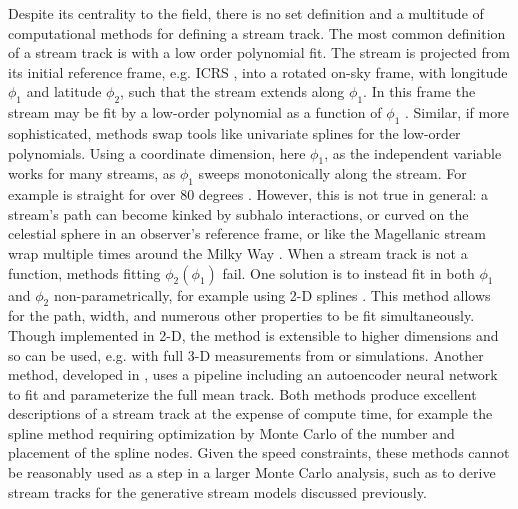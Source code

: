 \documentclass[fleqn,usenatbib]{mnras}
\begin{document}
  Despite its centrality to the field, there is no set definition and a
  multitude of computational methods for defining a stream track. The most
  common definition of a stream track is with a low order polynomial fit. The
  stream is projected from its initial reference frame, e.g. ICRS
  \citep{ICRS1997}, into a rotated on-sky frame, with longitude $\phi_1$ and
  latitude $\phi_2$, such that the stream extends along $\phi_1$. In this frame
  the stream may be fit by a low-order polynomial as a function of $\phi_1$
  \citep[e.g.][]{Bonaca2020}. Similar, if more sophisticated, methods swap tools
  like univariate splines \citep[e.g.][]{Erkal2017, Bonaca2018} for the
  low-order polynomials. Using a coordinate dimension, here $\phi_1$, as the
  independent variable works for many streams, as $\phi_1$ sweeps monotonically
  along the stream. For example  is straight for over 80 degrees
  \citep{Webb2019, Price-Whelan2018}. However, this is not true in general: a
  stream's path can become kinked by subhalo interactions, or curved on the
  celestial sphere in an observer's reference frame, or like the Magellanic
  stream wrap multiple times around the Milky Way \citep{Wannier1972}. When a
  stream track is not a function, methods fitting $\phi_2(\phi_1)$ fail. One
  solution is to instead fit in both $\phi_1$ and $\phi_2$ non-parametrically,
  for example using 2-D splines \citep{Erkal2017,Koposov2019, Li2021,
  Tavangar2022}. This method allows for the path, width, and numerous other
  properties to be fit simultaneously. Though implemented in 2-D, the method is
  extensible to higher dimensions and so can be used, e.g. with full 3-D
  measurements from \gaia{} or simulations. Another method, developed in
  \citet{Nibauer2022}, uses a pipeline including an autoencoder neural network
  to fit and parameterize the full mean track. Both methods produce excellent
  descriptions of a stream track at the expense of compute time, for example the
  spline method requiring optimization by Monte Carlo of the number and
  placement of the spline nodes. Given the speed constraints, these methods
  cannot be reasonably used as a step in a larger Monte Carlo analysis, such as
  to derive stream tracks for the generative stream models discussed previously.
  
\end{document}
